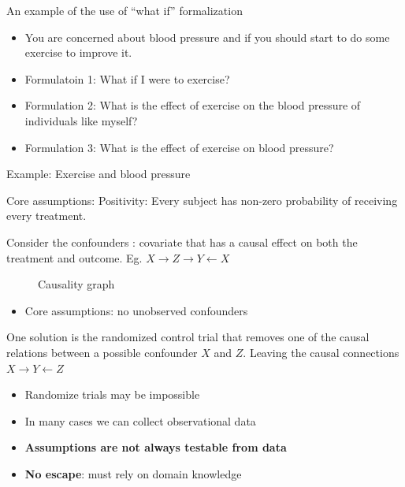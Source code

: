 \documentclass[b5paper]{report}
\begin{document}
An example of the use of ``what if'' formalization

\begin{itemize}
  \item You are concerned about blood pressure and if you should start to do
    some exercise to improve it.
  \item Formulatoin 1: What if I were to exercise?
  \item Formulation 2: What is the effect of exercise on the blood pressure of
    individuals like myself?
  \item Formulation 3: What is the effect of exercise on blood pressure?
\end{itemize}

Example: Exercise and blood pressure

Core assumptions: Positivity: Every subject has non-zero probability of
receiving every treatment.

Consider the confounders : covariate that has a causal effect on both the
treatment and outcome. Eg. $X \to Z \to Y \leftarrow X$

\begin{figure}[h]
  \centering
  \caption{Causality graph}
\end{figure}

\begin{itemize}
  \item Core assumptions: no unobserved confounders
\end{itemize}

One solution is the randomized control trial that removes one of the causal
relations between a possible confounder $X$ and $Z$. Leaving the causal
connections $X \to Y \leftarrow Z$

\begin{itemize}
  \item Randomize trials may be impossible
  \item In many cases we can collect observational data
  \item \textbf{Assumptions are not always testable from data}
  \item \textbf{No escape}: must rely on domain knowledge
\end{itemize}
\end{document}
